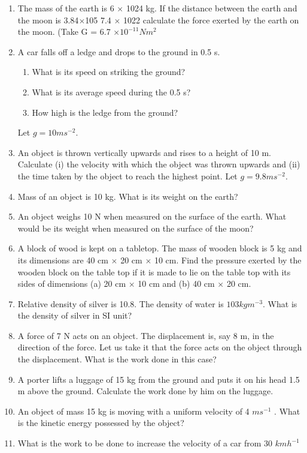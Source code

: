 \begin{enumerate}[label=\arabic*.,ref=\thesection.\theenumi]
\item The mass of the earth is 6 $\times$ 1024
kg. If the distance between the earth and the moon is 3.84$\times$105
7.4 $\times$ 1022
calculate the force exerted by the earth on the moon. (Take G = 6.7 $\times 10^{-11}
N m^2$ 
\item A car falls off a ledge and drops to the ground in 0.5 s. 
\begin{enumerate}
\item  What is its speed on striking the ground?
\item  What is its average speed during the 0.5 s?
\item  How high is the ledge from the ground?
\end{enumerate}
Let $g = 10 m s^{-2}$.
\item An object is thrown vertically upwards and rises to a height of 10 m. Calculate (i) the velocity with which the object was thrown upwards and (ii) the time taken by the object to reach the highest point. Let $g = 9.8 m s^{-2}$.
\item Mass of an object is 10 kg. What is its weight on the earth?
\item An object weighs 10 N when measured on the surface of the earth. What would be its weight when measured on the surface of the moon?
\item A block of wood is kept on a tabletop. The mass of wooden block is 5 kg and its dimensions are 40 cm $\times$ 20 cm $\times$ 10 cm. Find the pressure exerted by the wooden block on the table top if it is made to lie on the table top with its sides of dimensions (a) 20 cm $\times$ 10 cm and (b) 40 cm $\times$ 20 cm.
\item Relative density of silver is 10.8. The density of water is $103
kg m^{-3}$.  What is the density of silver in SI unit? 
\item A force of 7 N acts on an object. The displacement is, say 8 m, in the direction of the force. Let us take it that the force acts on the object through the displacement. What is the work done in this case?
\item A porter lifts a luggage of 15 kg from the ground and puts it on his head 1.5 m above the ground. Calculate the work done by him on the luggage.
\item An object of mass 15 kg is moving with a uniform velocity of 4
$m s^{-1}$ 
. What is the kinetic energy possessed by the object?
\item What is the work to be done to increase the velocity of a car from 30 $km h^{-1}$

\end{enumerate}
